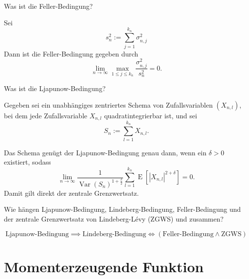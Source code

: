 \begin{QandA}
    \item Was ist die Feller-Bedingung?
    \begin{answered}
        Sei
        \[
            s_n^2 := \sum_{j=1}^{k_n} \sigma_{n,j}^2
        \]
        Dann ist die Feller-Bedingung gegeben durch
        \[
            \lim_{n \to \infty} \max_{1 \leq j \leq k_n} \frac{\sigma_{n,j}^2}{s_n^2} = 0.
        \]
    \end{answered}

    \item Was ist die Ljapunow-Bedingung?
    \begin{answered}
        Gegeben sei ein unabhängiges zentriertes Schema von Zufallsvariablen $(X_{n,l})$, bei dem jede Zufallsvariable $X_{n,l}$ quadratintegrierbar ist, und sei
        \[
            S_n := \sum_{l=1}^{k_n} X_{n,l}.
        \]

        Das Schema genügt der Ljapunow-Bedingung genau dann, wenn ein $\delta > 0$ existiert, sodass
        \[
            \lim_{n \to \infty} \frac{1}{\operatorname{Var}(S_n)^{1 + \frac{\delta}{2}}} \sum_{l=1}^{k_n} \operatorname{E} \left[ |X_{n,l}|^{2 + \delta} \right] = 0.
        \]
        Damit gilt direkt der zentrale Grenzwertsatz.
    \end{answered}

    \item Wie hängen Ljapunow-Bedingung, Lindeberg-Bedingung, Feller-Bedingung und der zentrale Grenzwertsatz von Lindeberg-Lévy (ZGWS) und zusammen?
    \begin{answered}
        \[
            \text{Ljapunow-Bedingung} \implies \text{Lindeberg-Bedingung} \iff (\text{Feller-Bedingung} \land \text{ZGWS})
        \]
    \end{answered}
\end{QandA}

\newpage
\section*{Momenterzeugende Funktion}

